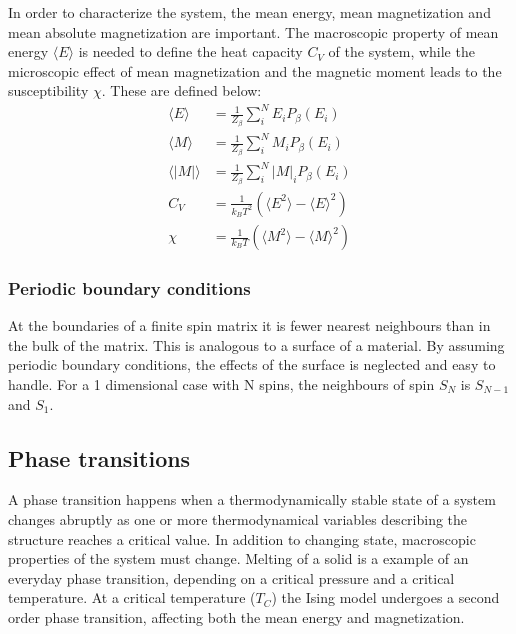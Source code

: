In order to characterize the system, the mean energy, mean magnetization and mean absolute magnetization are important. The macroscopic property of mean energy $ \langle E \rangle $ is needed to define the heat capacity $ C_V$ of the system, while the microscopic effect of mean magnetization and the magnetic moment leads to the susceptibility $ \chi $. These are defined below: 
\begin{align}
\langle E \rangle &= \frac{1}{Z_{\beta}} \sum\limits_{i}^N E_i P_{\beta}(E_i) \label{eq:L2_E}\\
\langle M \rangle &= \frac{1}{Z_{\beta}} \sum\limits_{i}^N M_i P_{\beta}(E_i) \label{eq:L2_M}\\
\langle |M | \rangle &= \frac{1}{Z_{\beta}} \sum\limits_{i}^N |M|_i P_{\beta}(E_i)\\
 C_V &= \frac{1}{k_B T^2} \left( 	\langle E^2 \rangle - \langle E\rangle^2 	\right) \label{eq_C_V_def}\\
\chi &= \frac{1}{k_B T} \left( 	\langle M^2 \rangle - \langle M\rangle^2 	\right)\label{eq_X_def}
\end{align}


\subsubsection{Periodic boundary conditions}

At the boundaries of a finite spin matrix it is fewer nearest neighbours than in the bulk of the matrix. This is analogous to a surface of a material. By assuming periodic boundary conditions, the effects of the surface is neglected and easy to handle. For a 1 dimensional case with N spins, the neighbours of spin $ S_N $ is $ S_{N-1} $ and $ S_1 $. 

\subsection{Phase transitions}

A phase transition happens when a thermodynamically stable state of a system changes abruptly as one or more thermodynamical  variables describing the structure reaches a critical value. In addition to changing state, macroscopic properties of the system must change. Melting of a solid is a example of an everyday phase transition, depending on a critical pressure and a critical temperature. At a critical temperature ($ T_C $) the Ising model undergoes a second order phase transition, affecting both the mean energy and magnetization. 


